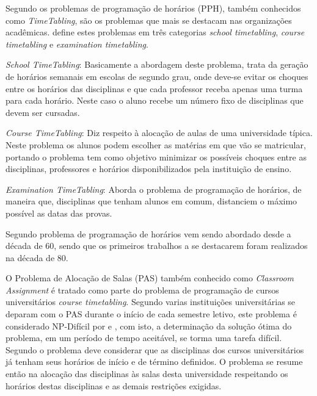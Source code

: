 

Segundo \cite{kripkasimulated} os problemas de programação de horários (PPH), também conhecidos como \textit{TimeTabling}, são os problemas que mais se destacam nas organizações acadêmicas. \cite{schaerf1999survey} define estes problemas em três categorias \textit{school timetabling}, \textit{course timetabling} e \textit{examination timetabling}.\par

\textit{School TimeTabling}: Basicamente a abordagem deste problema, trata da geração de horários semanais em escolas de segundo grau, onde deve-se evitar os choques entre os horários das disciplinas e que cada professor receba apenas uma turma para cada horário. Neste caso o aluno recebe um número fixo de disciplinas que devem ser cursadas.\par

\textit{Course TimeTabling}: Diz respeito à alocação de aulas de uma universidade típica. Neste problema os alunos podem escolher as matérias em que vão se matricular, portando o problema tem como objetivo minimizar os possíveis choques entre as disciplinas, professores e horários disponibilizados pela instituição de ensino.\par

\textit{Examination TimeTabling}: Aborda o problema de programação de horários, de maneira que, disciplinas que tenham alunos em comum, distanciem o máximo possível as datas das provas.\par

Segundo \cite{pinheiro2001ambiente} problema de programação de horários vem sendo abordado desde a década de 60, sendo que os primeiros trabalhos a se destacarem foram realizados na década de 80.\par

O Problema de Alocação de Salas (PAS) também conhecido como \textit{Classroom Assignment} é tratado como parte do problema de programação de cursos universitários \textit{course timetabling}. Segundo \cite{marinho2005heuristicas} varias instituições universitárias se deparam com o PAS durante o início de cada semestre letivo, este problema é considerado NP-Difícil por \cite{even1975complexity} e \cite{carter1992classroom}, com isto, a determinação da solução ótima do problema, em um período de tempo aceitável, se torma uma tarefa difícil. Segundo \cite{kripkasimulated} o problema deve considerar que as disciplinas dos cursos universitários já tenham seus horários de início e de término definidos. O problema se resume então na alocação das disciplinas às salas desta universidade respeitando os horários destas disciplinas e as demais restrições exigidas.\par

